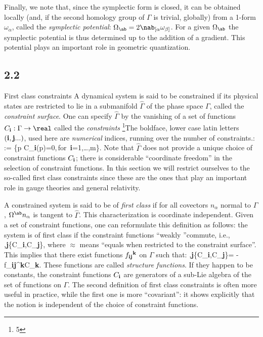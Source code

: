 Finally, we note that, since the symplectic form is closed, it can be obtained
locally (and, if the second homology group of $\Gamma$ is trivial, globally)
from a 1-form $\omega_\alpha$, called the {\it symplectic potential}:
$\Omega_\ab=2\nab_{[\alpha}\omega_{\beta]}$. For a given $\Omega_{\ab}$
the symplectic potential is thus determined up to the addition of a gradient.
This potential plays an important role in geometric quantization.
%
\goodbreak
\subsection{2.2}{First class constraints}
%
A dynamical system is said to be constrained if its physical states are
restricted to lie in a submanifold $\hat\Gamma$ of the phase space $\Gamma$,
called the {\it constraint surface}. One can specify $\hat\Gamma$ by the
vanishing of a set of functions $C_{\bf i}:\Gamma\to\real$ called the
{\it constraints}
\footnote{5}{The boldface, lower case latin letters $({\bf i}, {\bf
j}...)$, used here are {\it numerical} indices, running over the number of
constraints.}:
  \bneq
  \hat\Gamma:= \{p\in\Gamma\,\vert\,C_{\bf i}(p)=0,\,{\rm for}\
  {\bf i}=1,\ldots,m\}.
Note that $\hat\Gamma$ does not provide a unique choice of constraint
functions $C_{\bf i}$; there is considerable ``coordinate freedom'' in
the selection of constraint functions. In this section we will restrict
ourselves to the so-called first class constraints since these are the
ones that play an important role in gauge theories and general relativity.

A constrained system is said to be of {\it first class} if for all covectors
$n_\alpha$ normal to $\hat\Gamma$, $\Omega^\ab n_\alpha$ is tangent to
$\hat\Gamma$. This characterization is coordinate independent. Given a set
of constraint functions, one can reformulate this definition as follows:
the system is of first class if the constraint functions ``weakly ''commute,
i.e.,
\bneq
 ,{\bf j}\qquad\{C_{\bf i},C_{\bf j}\},
where $\approx$ means ``equals when restricted to the constraint surface''.
This implies that there exist functions $f_{{\bf ij}}{}^{\bf k}$ on
$\Gamma$ such that:
\bneq
{},{\bf j}\qquad\{C_{\bf i},C_{\bf j}\}=
 -f_{{\bf ij}}{}^{\bf k}C_{\bf k}.
These functions are called {\it structure functions}. If they happen to be
constants, the constraint functions $C_{\bf i}$ are generators of a sub-Lie
algebra of the set of functions on $\Gamma$. The second definition of first
class constraints is often more useful in practice, while the first one is
more ``covariant'': it shows explicitly that the notion is independent of
the choice of constraint functions.

